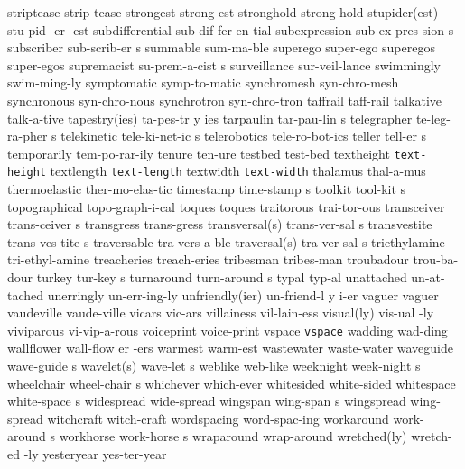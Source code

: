 \1 striptease		strip-tease		%
\1 strongest		strong-est
\1 stronghold		strong-hold
\3 stupider(est)	stu-pid -er -est
\1 subdifferential	sub-dif-fer-en-tial	%
\5 subexpression	sub-ex-pres-sion s	%
\5 subscriber 		sub-scrib-er s
\1 summable		sum-ma-ble
\1 superego		super-ego
\1 superegos		super-egos
\5 supremacist		su-prem-a-cist s
\1 surveillance		sur-veil-lance
\1 swimmingly		swim-ming-ly
\1 symptomatic		symp-to-matic
\1 synchromesh		syn-chro-mesh
\1 synchronous		syn-chro-nous
\1 synchrotron		syn-chro-tron
\1 taffrail		taff-rail		%
\1 talkative		talk-a-tive
\3 tapestry(ies)	ta-pes-tr y ies
\5 tarpaulin		tar-pau-lin s
\5 telegrapher		te-leg-ra-pher s
\5 telekinetic		tele-ki-net-ic s
\1 telerobotics		tele-ro-bot-ics
\5 teller		tell-er s		%
\1 temporarily		tem-po-rar-ily		%
\1 tenure		ten-ure
\1 testbed		test-bed
\NewWordtrue
\1 textheight		{\tt\bs text-height}	%
\NewWordtrue
\1 textlength		{\tt\bs text-length}	%
\1 textwidth		{\tt\bs text-width}
\1 thalamus		thal-a-mus
\1 thermoelastic	ther-mo-elas-tic
\5 timestamp		time-stamp s
\5 toolkit		tool-kit s
\1 topographical	topo-graph-i-cal
\1 toques		toques
\1 traitorous		trai-tor-ous
\5 transceiver		trans-ceiver s
\1 transgress		trans-gress
\2 transversal(s)	trans-ver-sal s
\5 transvestite		trans-ves-tite s
\1 traversable		tra-vers-a-ble
\2 traversal(s)		tra-ver-sal s
\1 triethylamine	tri-ethyl-amine		%
\1 treacheries		treach-eries
\NewWordtrue
\1 tribesman		tribes-man		%
\1 troubadour		trou-ba-dour
\5 turkey		tur-key s
\5 turnaround		turn-around s
\1 typal		typ-al
\1 unattached		un-at-tached
\1 unerringly		un-err-ing-ly
\3 unfriendly(ier)	un-friend-l y i-er
\1 vaguer		vaguer
\1 vaudeville		vaude-ville
\1 vicars		vic-ars
\1 villainess		vil-lain-ess
\2 visual(ly)		vis-ual -ly		%
\1 viviparous		vi-vip-a-rous
\1 voiceprint		voice-print
\1 vspace 		{\tt\bs vspace}
\1 wadding		wad-ding
\6 wallflower		wall-flow er -ers
\1 warmest		warm-est	%
\1 wastewater		waste-water
\5 waveguide		wave-guide s
\2 wavelet(s)		wave-let s
\1 weblike		web-like
\5 weeknight		week-night s
\5 wheelchair		wheel-chair s
\1 whichever		which-ever
\1 whitesided		white-sided
\5 whitespace		white-space s
\1 widespread		wide-spread
\5 wingspan		wing-span s	%
\1 wingspread		wing-spread
\1 witchcraft		witch-craft
\1 wordspacing		word-spac-ing
\5 workaround		work-around s		%
\5 workhorse		work-horse s
\1 wraparound		wrap-around
\2 wretched(ly)		wretch-ed -ly
\1 yesteryear		yes-ter-year
\endgraf
\endgroup

